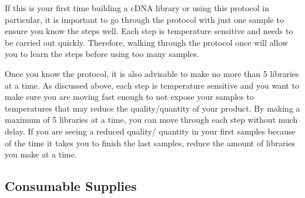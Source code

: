 \documentclass[11pt, oneside]{article}
\begin{document}
	\vspace{2mm}
	
	\noindent If this is your first time building a cDNA library or using this protocol in particular, it is important to go through the protocol with just one sample 	to ensure you know the steps well. Each step is temperature sensitive and needs to be carried out quickly. Therefore, walking through the protocol once 	will allow you to learn the steps before using too many samples. 
	
	\vspace{2mm}
	
	\noindent Once you know the protocol, it is also advisable to make no more than 5 libraries at a time. As discussed above, each step is temperature 	sensitive and you want to make sure you are moving fast enough to not expose your samples to temperatures that may reduce the quality/quantity of 	your product. By making a maximum of 5 libraries at a time, you can move through each step without much delay. If you are seeing a reduced quality/	quantity in your first samples because of the time it takes you to finish the last samples, reduce the amount of libraries you make at a time. 
	
	\vspace{3mm}
	
	\subsection{Consumable Supplies}
	
		\vspace{3mm}
		
\end{document}
